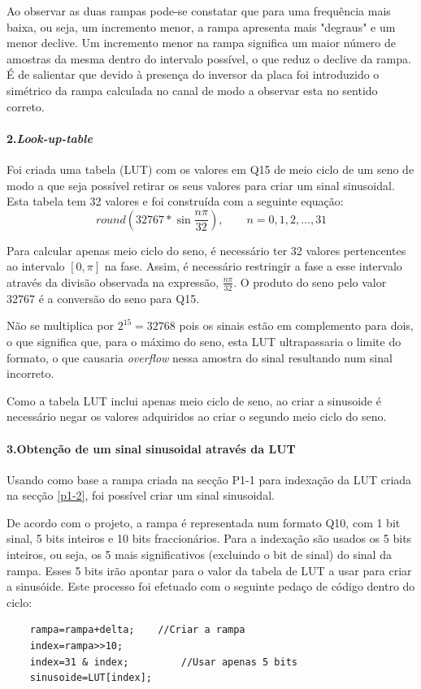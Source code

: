 \documentclass[11pt]{article}
\numberwithin{equation}{section}
\begin{document}
	Ao observar as duas rampas pode-se constatar que para uma frequência mais baixa, ou seja, um incremento menor, a rampa apresenta mais "degraus" e um menor declive. Um incremento menor na rampa significa um maior número de amostras da mesma dentro do intervalo possível, o que reduz o declive da rampa. É de salientar que devido à presença do inversor da placa foi introduzido o simétrico da rampa calculada no canal de modo a observar esta no sentido correto.
	\paragraph{2.\textit{Look-up-table}} \hspace{0pt}
	\label{p1-2}
	
	Foi criada uma tabela (LUT) com os valores em Q15 de meio ciclo de um seno de modo a que seja possível retirar os seus valores para criar um sinal sinusoidal. Esta tabela tem 32 valores e foi construída com a seguinte equação:
	\begin{equation}
	round \left(32767*\sin \dfrac{n \pi}{32} \right),  \quad \quad n=0,1,2,...,31
	\end{equation}
	
	Para calcular apenas meio ciclo do seno, é necessário ter 32 valores pertencentes ao intervalo $[0,\pi]$ na fase. Assim, é necessário restringir a fase a esse intervalo através da divisão observada na expressão, $\frac{n \pi}{32}$. O produto do seno pelo valor 32767 é a conversão do seno para Q15. 
	
	Não se multiplica por $2 ^{15}=32768$ pois os sinais estão em complemento para dois, o que significa que, para o máximo do seno, esta LUT ultrapassaria o limite do formato, o que causaria \textit{overflow} nessa amostra do sinal resultando num sinal incorreto.
	
	Como a tabela LUT inclui apenas meio ciclo de seno, ao criar a sinusoide é necessário negar os valores adquiridos ao criar o segundo meio ciclo do seno.
	
	\paragraph{3.Obtenção de um sinal sinusoidal através da LUT} \hspace{0pt}
	\label{p1-3}
	
	Usando como base a rampa criada na secção P1-1 para indexação da LUT criada na secção \ref{p1-2}, foi possível criar um sinal  sinusoidal.
	
	De acordo com o projeto, a rampa é representada num formato Q10, com 1 bit sinal, 5 bits inteiros e 10 bits fraccionários. 
	Para a indexação são usados os 5 bits inteiros, ou seja, os 5 mais significativos (excluindo o bit de sinal) do sinal da rampa. Esses 5 bits irão apontar para o valor da tabela de LUT a usar para criar a sinusóide. 
	Este processo foi efetuado com o seguinte pedaço de código dentro do ciclo:
	\begin{lstlisting}
	rampa=rampa+delta;    //Criar a rampa
	index=rampa>>10;
	index=31 & index;         //Usar apenas 5 bits
	sinusoide=LUT[index];
	\end{lstlisting}
	
\end{document}
